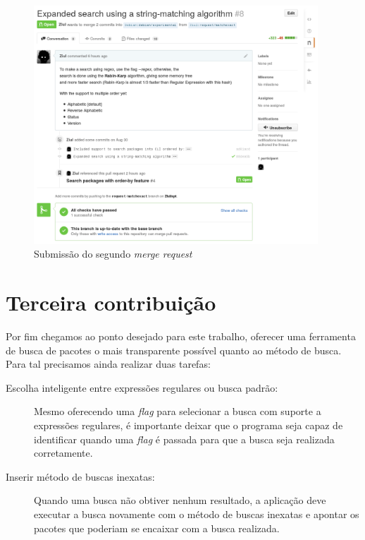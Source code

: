 \begin{figure}[h]
  \centering
	\includegraphics[width=0.95\textwidth]{figuras/pr2}
  \caption{Submissão do segundo \textit{merge request}}
  \label{fig:pr2_travisok}
\end{figure}


\section{Terceira contribuição} %
\label{sec:terceira_contribui_o}

Por fim chegamos ao ponto desejado para este trabalho, oferecer uma ferramenta de busca de pacotes o mais transparente possível quanto ao método de busca. Para tal precisamos ainda realizar duas tarefas:

\begin{description}
	\item [Escolha inteligente entre expressões regulares ou busca padrão:] Mesmo oferecendo uma \textit{flag} para selecionar a busca com suporte a expressões regulares, é importante deixar que o programa seja capaz de identificar quando uma \textit{flag} é passada para que a busca seja realizada corretamente.
	\item [Inserir método de buscas inexatas:] Quando uma busca não obtiver nenhum resultado, a aplicação deve executar a busca novamente com o método de buscas inexatas e apontar os pacotes que poderiam se encaixar com a busca realizada.
\end{description}

